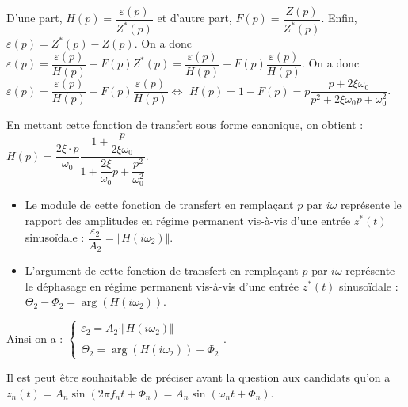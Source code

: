 \ifprof
\begin{corrige}

D'une part, $H(p)=\dfrac{\varepsilon (p)}{Z^*(p)}$ et d'autre part, $F(p)=\dfrac{Z (p)}{Z^*(p)}$. Enfin, $\varepsilon(p)=Z^*(p)-Z(p)$. On a donc $\varepsilon(p)=\dfrac{\varepsilon(p)}{H(p)} - F(p)Z^*(p)=\dfrac{\varepsilon(p)}{H(p)} - F(p)\dfrac{\varepsilon(p)}{H(p)}$. On a donc  $\varepsilon(p)=\dfrac{\varepsilon(p)}{H(p)} - F(p)\dfrac{\varepsilon(p)}{H(p)} \Leftrightarrow $ $H(p)=1 - F(p)= p\dfrac{p+2\xi\omega_0  }{p^2+2\xi\omega_0 p + \omega_0^2}$.


En mettant cette fonction de transfert sous forme canonique, on  obtient : 
$
H(p)=\dfrac{2\xi\cdot p}{\omega_0}\dfrac{1+\dfrac{p}{2\xi\omega_0}}{1+\dfrac{2\xi}{\omega_0}p+\dfrac{p^2}{\omega_0^2}}
$.

\begin{itemize}
\item Le module de cette fonction de transfert en remplaçant $p$ par $i\omega$ représente le rapport des amplitudes en régime permanent vis-à-vis d'une entrée $z^*(t)$ sinusoïdale : 
$
\dfrac{\varepsilon_2}{A_2}=\Vert H(i\omega_2)\Vert
$.
\item L'argument de cette fonction de transfert en remplaçant $p$ par $i\omega$ représente le déphasage en régime permanent vis-à-vis d'une entrée $z^*(t)$ sinusoïdale : 
$
\Theta_2-\Phi_2=\arg\left(H(i\omega_2)\right)
$.
\end{itemize}

Ainsi on a : 
$
\left\{
\begin{array}{c}
\varepsilon_2=A_2\cdot \Vert H(i\omega_2)\Vert\\
\\
\Theta_2=\arg\left(H(i\omega_2)\right)+\Phi_2
\end{array}
\right.
$.





\begin{rem}
Il est peut être souhaitable de préciser avant la question aux candidats qu'on a $z_n(t)=A_n\sin \left(2\pi f_n t + \Phi_n \right)=A_n\sin \left(\omega_n t + \Phi_n \right)$. 
\end{rem}

\end{corrige}
\else
\fi


